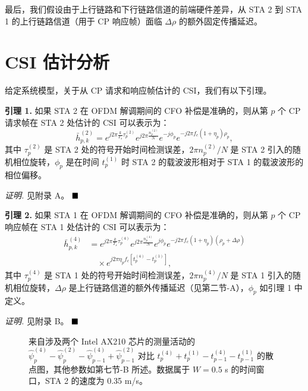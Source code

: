 \documentclass[journal]{IEEEtran}
\begin{document}
最后，我们假设由于上行链路和下行链路信道的前端硬件差异，从 STA 2 到 STA 1 的上行链路信道（用于 CP 响应帧）面临 $\Delta \rho$ 的额外固定传播延迟。

\section{CSI 估计分析}
给定系统模型，关于从 CP 请求和响应帧估计的 CSI，我们有以下引理。

\textbf{引理 1.} 如果 STA 2 在 OFDM 解调期间的 CFO 补偿是准确的，则从第 $p$ 个 CP 请求帧在 STA 2 处估计的 CSI 可以表示为：
\begin{equation}
\bar{h}_{p,k}^{(2)} = e^{j2\pi \frac{k}{T_s} \tau_p^{(2)}} e^{j2\pi \frac{n_p^{(2)}}{N}} e^{-j\phi_p} e^{-j2\pi f_c(1+\eta_p)\rho_p}, \label{eq:2}
\end{equation}
其中 $\tau_p^{(2)}$ 是 STA 2 处的符号开始时间检测误差，$2\pi n_p^{(2)}/N$ 是 STA 2 引入的随机相位旋转，$\phi_p$ 是在时间 $t_p^{(1)}$ 时 STA 2 的载波波形相对于 STA 1 的载波波形的相位偏移。

\textit{证明.} 见附录 A。 $\hfill \blacksquare$

\textbf{引理 2.} 如果 STA 1 在 OFDM 解调期间的 CFO 补偿是准确的，则从第 $p$ 个 CP 响应帧在 STA 1 处估计的 CSI 可以表示为：
\begin{equation}
\begin{split}
\bar{h}_{p,k}^{(4)} &= e^{j2\pi \frac{k}{T_s} \tau_p^{(4)}} e^{j2\pi \frac{n_p^{(4)}}{N}} e^{j\phi_p} e^{-j2\pi f_c(1+\eta_p)(\rho_p+\Delta\rho)} \\
&\quad \times e^{j2\pi \eta_p f_c [t_p^{(4)} - t_p^{(1)}]},
\end{split} \label{eq:3}
\end{equation}
其中 $\tau_p^{(4)}$ 是 STA 1 处的符号开始时间检测误差，$2\pi n_p^{(4)}/N$ 是 STA 1 引入的随机相位旋转，$\Delta\rho$ 是上行链路信道的额外传播延迟（见第二节-A），$\phi_p$ 如引理 1 中定义。

\textit{证明.} 见附录 B。 $\hfill \blacksquare$

\begin{figure}[htbp]
\centering
{}
\caption{来自涉及两个 Intel AX210 芯片的测量活动的 $\hat{\psi}_p^{(4)} - \hat{\psi}_p^{(2)} - \hat{\psi}_{p-1}^{(4)} + \hat{\psi}_{p-1}^{(2)}$ 对比 $t_p^{(4)} + t_p^{(1)} - t_{p-1}^{(4)} - t_{p-1}^{(1)}$ 的散点图，其他参数如第七节-B 所述。数据属于 $W=0.5$ s 的时间窗口，STA 2 的速度为 0.35 m/s。}
\label{fig:fig5}
\end{figure}
\end{document}
